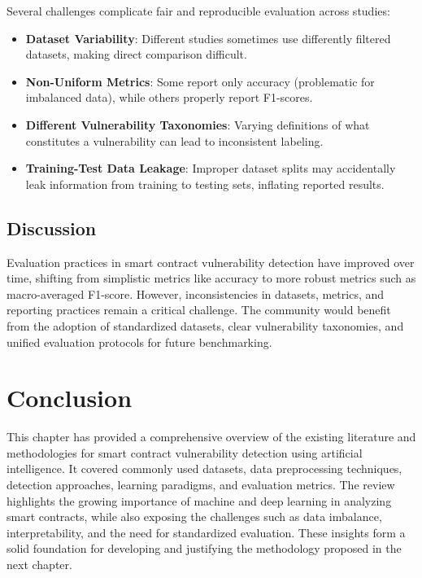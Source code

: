 Several challenges complicate fair and reproducible evaluation across studies:

\begin{itemize}
    \item \textbf{Dataset Variability}: Different studies sometimes use differently filtered datasets, making direct comparison difficult.
    
    \item \textbf{Non-Uniform Metrics}: Some report only accuracy (problematic for imbalanced data), while others properly report F1-scores.
    
    \item \textbf{Different Vulnerability Taxonomies}: Varying definitions of what constitutes a vulnerability can lead to inconsistent labeling.
    
    \item \textbf{Training-Test Data Leakage}: Improper dataset splits may accidentally leak information from training to testing sets, inflating reported results.
\end{itemize}

\subsection*{Discussion}

Evaluation practices in smart contract vulnerability detection have improved over time, shifting from simplistic metrics like accuracy to more robust metrics such as macro-averaged F1-score. However, inconsistencies in datasets, metrics, and reporting practices remain a critical challenge. The community would benefit from the adoption of standardized datasets, clear vulnerability taxonomies, and unified evaluation protocols for future benchmarking.

\section*{Conclusion}
This chapter has provided a comprehensive overview of the existing literature and methodologies for smart contract vulnerability detection using artificial intelligence. It covered commonly used datasets, data preprocessing techniques, detection approaches, learning paradigms, and evaluation metrics. The review highlights the growing importance of machine and deep learning in analyzing smart contracts, while also exposing the challenges such as data imbalance, interpretability, and the need for standardized evaluation. These insights form a solid foundation for developing and justifying the methodology proposed in the next chapter.

